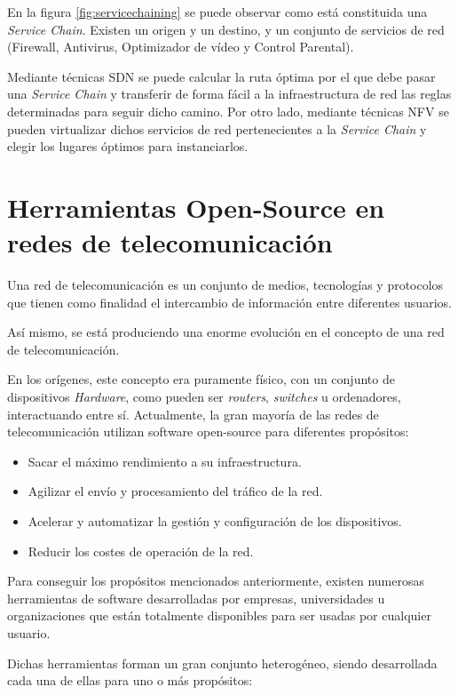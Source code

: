 En la figura \ref{fig:servicechaining} se puede observar como está constituida una \textit{Service Chain}. Existen un origen y un destino, y un conjunto de servicios de red (Firewall, Antivirus, Optimizador de vídeo y Control Parental).

Mediante técnicas SDN se puede calcular la ruta óptima por el que debe pasar una \textit{Service Chain} y transferir de forma fácil a la infraestructura de red las reglas determinadas para seguir dicho camino. Por otro lado, mediante técnicas NFV se pueden virtualizar dichos servicios de red pertenecientes a la \textit{Service Chain} y elegir los lugares óptimos para instanciarlos.


\section{Herramientas Open-Source en redes de telecomunicación}
\label{sec:opensourcenets}

Una red de telecomunicación es un conjunto de medios, tecnologías y protocolos que tienen como finalidad el intercambio de información entre diferentes usuarios.

Así mismo, se está produciendo una enorme evolución en el concepto de una red de telecomunicación. 

En los orígenes, este concepto era puramente físico, con un conjunto de dispositivos \textit{Hardware}, como pueden ser \textit{routers}, \textit{switches} u ordenadores, interactuando entre sí. Actualmente, la gran mayoría de las redes de telecomunicación utilizan software open-source para diferentes propósitos:

\begin{itemize}
	\item Sacar el máximo rendimiento a su infraestructura.
	\item Agilizar el envío y procesamiento del tráfico de la red.
	\item Acelerar y automatizar la gestión y configuración de los dispositivos.
	\item Reducir los costes de operación de la red.
\end{itemize}

Para conseguir los propósitos mencionados anteriormente, existen numerosas herramientas de software desarrolladas por empresas, universidades u organizaciones que están totalmente disponibles para ser usadas por cualquier usuario.

Dichas herramientas forman un gran conjunto heterogéneo, siendo desarrollada cada una de ellas para uno o más propósitos:


